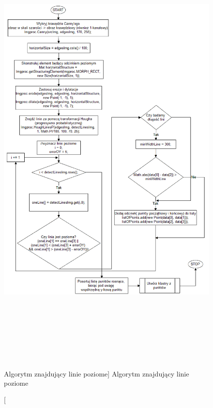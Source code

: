 \documentclass[a4paper,12pt]{article}
\begin{document}
    		    
    			\begin{figure}[!ht]  
    		        \begin{center}
    		    	    \includegraphics[height=23cm]{image//algorithm//prepareImgToAnalize.png} 
    			    \end{center}
    		    	\caption
        	    		[Algorytm znajdujący linie poziome]  
            			{Algorytm znajdujący linie poziome}  
    		    \end{figure}	
				
\end{document}
